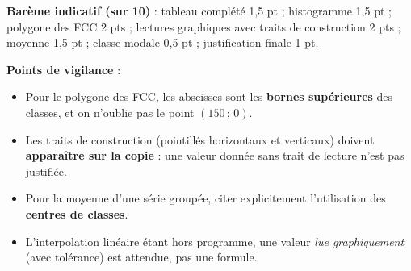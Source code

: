 \documentclass[11pt]{article}
\begin{document}
\begin{corrige}
\textbf{Barème indicatif (sur 10)} : tableau complété 1,5 pt ; histogramme 1,5 pt ; polygone des FCC 2 pts ; lectures graphiques avec traits de construction 2 pts ; moyenne 1,5 pt ; classe modale 0,5 pt ; justification finale 1 pt.

\textbf{Points de vigilance} :
\begin{itemize}
    \item Pour le polygone des FCC, les abscisses sont les \textbf{bornes supérieures} des classes, et on n'oublie pas le point $(150\,;\,0)$.
    \item Les traits de construction (pointillés horizontaux et verticaux) doivent \textbf{apparaître sur la copie} : une valeur donnée sans trait de lecture n'est pas justifiée.
    \item Pour la moyenne d'une série groupée, citer explicitement l'utilisation des \textbf{centres de classes}.
    \item L'interpolation linéaire étant hors programme, une valeur \emph{lue graphiquement} (avec tolérance) est attendue, pas une formule.
\end{itemize}
\end{corrige}
\end{document}

